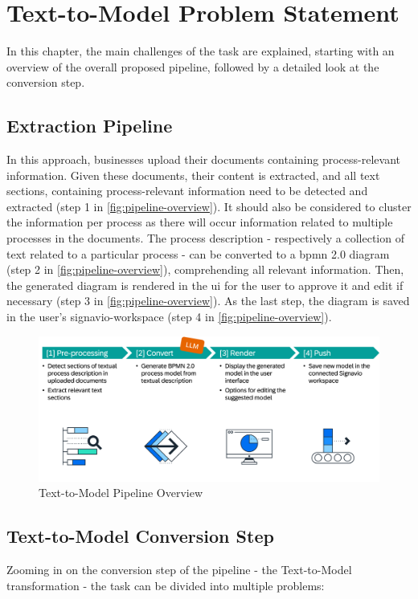 \chapter{Text-to-Model Problem Statement}
In this chapter, the main challenges of the task are explained, starting with an overview of the overall proposed pipeline, followed by a detailed look at the conversion step.

\section{Extraction Pipeline}\label{sec:pipeline}
In this approach, businesses upload their documents containing process-relevant information. Given these documents, their content is extracted, and all text sections, containing process-relevant information need to be detected and extracted (step 1 in \autoref{fig:pipeline-overview}). It should also be considered to cluster the information per process as there will occur information related to multiple processes in the documents. The process description - respectively a collection of text related to a particular process - can be converted to a \acs{bpmn} 2.0 diagram (step 2 in \autoref{fig:pipeline-overview}), comprehending all relevant information. Then, the generated diagram is rendered in the \acs{ui} for the user to approve it and edit if necessary (step 3 in \autoref{fig:pipeline-overview}). As the last step, the diagram is saved in the user's \gls{signavio-workspace} (step 4 in \autoref{fig:pipeline-overview}).

\begin{figure}[h]
    \centering
    \includegraphics[width=\textwidth,height=\textheight,keepaspectratio]{../assets/images/Text to Model Pipeline.png}
    \caption[Text-to-Model Pipeline Overview]{Text-to-Model Pipeline Overview}
    \label{fig:pipeline-overview}
\end{figure}

\section{Text-to-Model Conversion Step}\label{sec:conversion}
Zooming in on the conversion step of the pipeline - the Text-to-Model transformation - the task can be divided into multiple problems:

